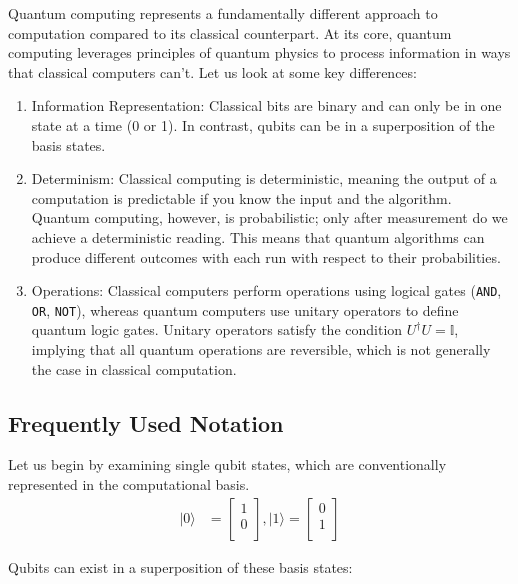 \documentclass[msc,oneside]{ubcthesis}
\begin{document}
	Quantum computing represents a fundamentally different approach to computation compared to its classical counterpart. At its core, quantum computing leverages principles of quantum physics to process information in ways that classical computers can't. Let us look at some key differences:
	\begin{enumerate}
		\item 	Information Representation: Classical bits are binary and can only be in one state at a time (0 or 1). In contrast, qubits can be in a superposition of the basis states.

		\item 	Determinism: Classical computing is deterministic, meaning the output of a computation is predictable if you know the input and the algorithm. Quantum computing, however, is probabilistic; only after measurement do we achieve a deterministic reading. This means that quantum algorithms can produce different outcomes with each run with respect to their probabilities.
		
		\item Operations: Classical computers perform operations using logical gates (\texttt{AND}, \texttt{OR}, \texttt{NOT}), whereas quantum computers use unitary operators to define quantum logic gates. Unitary operators satisfy the condition $U^{\dagger}U = \mathbb{I}$, implying that all quantum operations are reversible, which is not generally the case in classical computation.
		
	\end{enumerate}
	
	
	\subsection{Frequently Used Notation}
	
	Let us begin by examining single qubit states, which are conventionally represented in the computational basis.
	\begin{align*}	
		|0\rangle &= \begin{bmatrix}
			1 \\
			0 \\
		\end{bmatrix}, 
		|1\rangle = \begin{bmatrix}
			0 \\
			1 \\
		\end{bmatrix}
	\end{align*}
	
	Qubits can exist in a superposition of these basis states:
	
\end{document}
